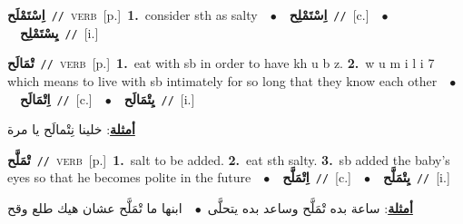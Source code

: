 \documentclass[10pt,a4paper,twoside]{article} %
\begin{document}
\begin{multicols}{2}
{\setlength\topsep{0pt}\textbf{\foreignlanguage{arabic}{اِسْتَمْلَح}}\ {\color{gray}\texttt{//}\color{black}}\ \textsc{verb}\ [p.]\ \textbf{1.}~consider sth as salty\ \ $\bullet$\ \ \setlength\topsep{0pt}\textbf{\foreignlanguage{arabic}{اِسْتَمْلِح}}\ {\color{gray}\texttt{//}\color{black}}\ [c.]\ \ $\bullet$\ \ \setlength\topsep{0pt}\textbf{\foreignlanguage{arabic}{يِسْتَمْلِح}}\ {\color{gray}\texttt{//}\color{black}}\ [i.]\ } \vspace{2mm}

{\setlength\topsep{0pt}\textbf{\foreignlanguage{arabic}{تْمَالَح}}\ {\color{gray}\texttt{//}\color{black}}\ \textsc{verb}\ [p.]\ \textbf{1.}~eat with sb in order to have kh u b z.  \textbf{2.}~w u m i l i 7 which means to live with sb intimately for so long that they know each other\ \ $\bullet$\ \ \setlength\topsep{0pt}\textbf{\foreignlanguage{arabic}{اِتْمَالَح}}\ {\color{gray}\texttt{//}\color{black}}\ [c.]\ \ $\bullet$\ \ \setlength\topsep{0pt}\textbf{\foreignlanguage{arabic}{يِتْمَالَح}}\ {\color{gray}\texttt{//}\color{black}}\ [i.]\  \begin{flushright}\color{gray}\foreignlanguage{arabic}{\textbf{\underline{\foreignlanguage{arabic}{أمثلة}}}: خلينا نِتْمالَح يا مرة}\end{flushright}\color{black}} \vspace{2mm}

{\setlength\topsep{0pt}\textbf{\foreignlanguage{arabic}{تْمَلَّح}}\ {\color{gray}\texttt{//}\color{black}}\ \textsc{verb}\ [p.]\ \textbf{1.}~salt to be added.  \textbf{2.}~eat sth salty.  \textbf{3.}~sb added the baby's eyes so that he becomes polite in the future\ \ $\bullet$\ \ \setlength\topsep{0pt}\textbf{\foreignlanguage{arabic}{اِتْمَلَّح}}\ {\color{gray}\texttt{//}\color{black}}\ [c.]\ \ $\bullet$\ \ \setlength\topsep{0pt}\textbf{\foreignlanguage{arabic}{يِتْمَلَّح}}\ {\color{gray}\texttt{//}\color{black}}\ [i.]\  \begin{flushright}\color{gray}\foreignlanguage{arabic}{\textbf{\underline{\foreignlanguage{arabic}{أمثلة}}}: ساعة بده تْمَلَّح وساعد بده يتحلَّى\ $\bullet$\ \  ابنها ما تْمَلَّح عشان هيك طلع وقح}\end{flushright}\color{black}} \vspace{2mm}


\end{multicols}
\end{document}
